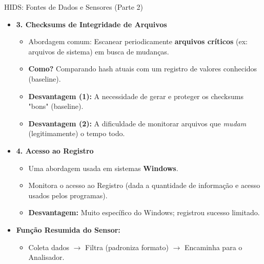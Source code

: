 \begin{frame}{HIDS: Fontes de Dados e Sensores (Parte 2)}
    \begin{itemize}
        \item \textbf{3. Checksums de Integridade de Arquivos }
              \begin{itemize}
                  \item Abordagem comum: Escanear periodicamente \textbf{arquivos críticos} (ex: arquivos de sistema) em busca de mudanças.
                  \item \textbf{Como?} Comparando hash atuais com um registro de valores conhecidos (baseline).
                  \item \textbf{Desvantagem (1):} A necessidade de gerar e proteger os checksums "bons" (baseline).
                  \item \textbf{Desvantagem (2):} A dificuldade de monitorar arquivos que \textit{mudam} (legitimamente) o tempo todo.
              \end{itemize}

        \item \textbf{4. Acesso ao Registro}
              \begin{itemize}
                  \item Uma abordagem usada em sistemas \textbf{Windows}.
                  \item Monitora o acesso ao Registro (dada a quantidade de informação e acesso usados pelos programas).
                  \item \textbf{Desvantagem:} Muito específico do Windows; registrou sucesso limitado.
              \end{itemize}

        \item \textbf{Função Resumida do Sensor:}
              \begin{itemize}
                  \item Coleta dados $\rightarrow$ Filtra (padroniza formato) $\rightarrow$ Encaminha para o Analisador.
              \end{itemize}
    \end{itemize}
\end{frame}

